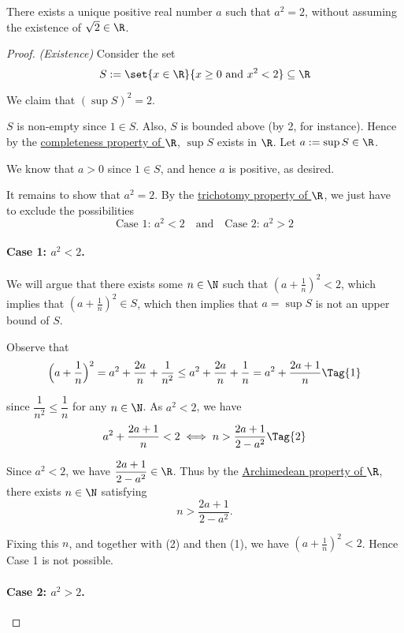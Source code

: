 There exists a unique positive real number $a$ such that $a^2=2$, without
assuming the existence of $\sqrt2\in\R$.

\begin{proof}
  \textit{(Existence)} Consider the set
  $$
    S:=\set{x\in\R}{x\geq0\text{ and }x^2<2}\subseteq\R
  $$

  We claim that $(\sup S)^2=2$.

  $S$ is non-empty since $1\in S$. Also, $S$ is bounded above (by 2, for
  instance). Hence by the \href{f330cf9}{completeness property of $\R$}, $\sup
  S$ exists in $\R$. Let $a:=\sup S\in\R$.

  We know that $a>0$ since $1\in S$, and hence $a$ is positive, as desired.

  It remains to show that $a^2=2$. By the \href{d49c63e}{trichotomy property of
  $\R$}, we just have to exclude the possibilities
  $$
    \text{Case 1: }a^2<2\quad\text{and}\quad\text{Case 2: }a^2>2
  $$

  \paragraph{Case 1: $a^2<2$.}

  We will argue that there exists some $n\in\N$ such that $(a+\frac1n)^2<2$,
  which implies that $(a+\frac1n)^2\in S$, which then implies that $a=\sup S$ is
  not an upper bound of $S$.

  Observe that
  \begin{equation*}
    \Big(a+\frac1n\Big)^2=a^2+\frac{2a}n+\frac1{n^2}\leq
    a^2+\frac{2a}n+\frac1n=a^2+\frac{2a+1}n\Tag{1}
  \end{equation*}

  since $\dfrac1{n^2}\leq\dfrac1n$ for any $n\in\N$. As $a^2<2$, we have
  \begin{equation*}
    a^2+\frac{2a+1}n<2\iff n>\frac{2a+1}{2-a^2}\Tag{2}
  \end{equation*}

  Since $a^2<2$, we have $\dfrac{2a+1}{2-a^2}\in\R$. Thus by the
  \href{fbc2289}{Archimedean property of $\R$}, there exists $n\in\N$ satisfying
  $$
    n>\frac{2a+1}{2-a^2}.
  $$

  Fixing this $n$, and together with (2) and then (1), we have
  $(a+\frac1{n})^2<2$. Hence Case 1 is not possible.

  \paragraph{Case 2: $a^2>2$.}


\end{proof}
